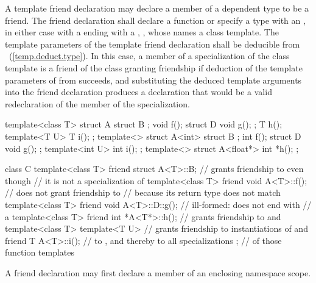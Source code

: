 \pnum
A template friend declaration may declare
a member of a dependent type to be a friend.
The friend declaration shall declare a function or
specify a type with an ,
in either case with a 
ending with a , ,
whose  names a class template.
The template parameters of the template friend declaration
shall be deducible from ~(\ref{temp.deduct.type}).
In this case,
a member of a specialization  of the class template
is a friend of the class granting friendship
if deduction of the template parameters
of  from  succeeds, and
substituting the deduced template arguments into the friend declaration
produces a declaration that would be a valid redeclaration
of the member of the specialization.
\begin{example}

\begin{codeblock}
template<class T> struct A {
  struct B { };
  void f();
  struct D {
    void g();
  };
  T h();
  template<T U> T i();
};
template<> struct A<int> {
  struct B { };
  int f();
  struct D {
    void g();
  };
  template<int U> int i();
};
template<> struct A<float*> {
  int *h();
};

class C {
  template<class T> friend struct A<T>::B;      // grants friendship to  even though
                                                // it is not a specialization of 
  template<class T> friend void A<T>::f();      // does not grant friendship to 
                                                // because its return type does not match
  template<class T> friend void A<T>::D::g();   // ill-formed:  does not end with
                                                // a 
  template<class T> friend int *A<T*>::h();     // grants friendship to  and 
  template<class T> template<T U>               // grants friendship to instantiations of  and
    friend T A<T>::i();                         // to , and thereby to all specializations
};                                              // of those function templates
\end{codeblock}
\end{example}

\pnum
\begin{note}
A friend declaration may first declare a member of an enclosing namespace scope.
\end{note}

